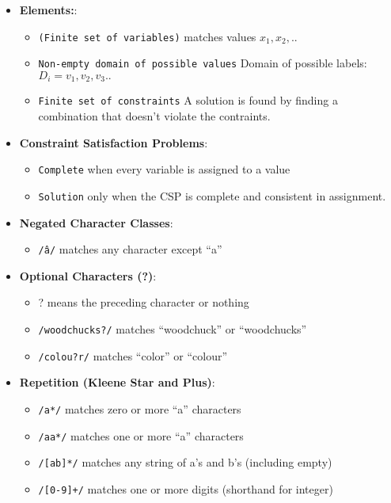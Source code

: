 \documentclass{article}
\begin{document}
\begin{itemize}
    \item \textbf{Elements:}:
          \begin{itemize}
              \item \texttt{(Finite set of variables)} matches values $x_1,x_2,..$
              \item \texttt{Non-empty domain of possible values} Domain of possible labels: $D_i=v_1, v_2, v_3..$ 
              \item \texttt{Finite set of constraints} A solution is found by finding a combination that doesn't violate the contraints. 
          \end{itemize}

    \item \textbf{Constraint Satisfaction Problems}:
          \begin{itemize}
              \item \texttt{Complete} when every variable is assigned to a value 
              \item \texttt{Solution} only when the CSP is complete and consistent in assignment. 
          \end{itemize}

    \item \textbf{Negated Character Classes}:
          \begin{itemize}
              \item \texttt{/\^a/} matches any character except “a”
          \end{itemize}

    \item \textbf{Optional Characters (?)}:
          \begin{itemize}
              \item ? means the preceding character or nothing
              \item \texttt{/woodchucks?/} matches “woodchuck” or “woodchucks”
              \item \texttt{/colou?r/} matches “color” or “colour”
          \end{itemize}

    \item \textbf{Repetition (Kleene Star and Plus)}:
          \begin{itemize}
              \item \texttt{/a*/} matches zero or more “a” characters
              \item \texttt{/aa*/} matches one or more “a” characters
              \item \texttt{/[ab]*/} matches any string of a’s and b’s (including empty)
              \item \texttt{/[0-9]+/} matches one or more digits (shorthand for integer)
          \end{itemize}


\end{itemize}
\end{document}
